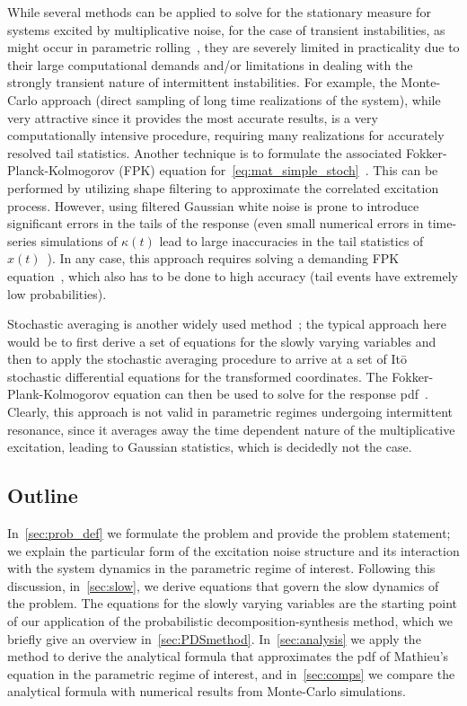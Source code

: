 \documentclass[3p]{elsarticle}
\begin{document}
While several   methods can be applied to solve for the stationary measure for systems excited by multiplicative noise, for the case  of transient instabilities,   as might occur  in parametric rolling~, they are severely limited in practicality  due to their large computational demands and/or limitations in dealing with  the strongly transient nature of intermittent instabilities.  For example, the Monte-Carlo approach (direct sampling of long time realizations  of the system), while very attractive since it  provides the most accurate results, is  a very computationally intensive procedure, requiring many realizations  for  accurately resolved  tail statistics. Another technique is to  formulate the associated Fokker-Planck-Kolmogorov (FPK) equation for~\cref{eq:mat_simple_stoch}~\cite{soize94}. This can be performed by utilizing shape filtering to  approximate the correlated excitation process.  However, using filtered Gaussian white noise is  prone to introduce significant errors in  the tails of the response (even small numerical errors in time-series simulations of $\kappa(t)$  lead to large inaccuracies in the tail statistics of $x(t)$~\cite{majda_branicki_DCDS}). In any case, this approach   requires solving a   demanding FPK equation~\cite{Masud_bergman05}, which also has to be done to high accuracy (tail events have extremely low probabilities). 

Stochastic averaging is another widely used method~\cite{Pavliotis2008}; the typical approach here   would be to first derive a set of equations for the slowly varying variables and then to  apply  the    stochastic averaging procedure to arrive at a set of  It\={o} stochastic differential equations for the transformed coordinates. The Fokker-Plank-Kolmogorov equation can then be used to solve for the response pdf~\cite{Lin_Cai95,8702927420120101}. Clearly, this approach is not valid in parametric regimes undergoing intermittent resonance, since it averages away the time dependent nature of the multiplicative excitation, leading to Gaussian statistics, which is  decidedly not the case.

\subsection{Outline}
In~\cref{sec:prob_def} we formulate the problem and provide the   problem statement; we explain  the particular form of the excitation noise structure and its interaction with the system dynamics in the parametric regime of interest. Following this discussion, in~\cref{sec:slow}, we derive equations that govern the slow dynamics of the problem. The equations for the slowly varying variables are the starting point of our application of the probabilistic decomposition-synthesis method, which we briefly give an overview in~\cref{sec:PDSmethod}. In~\cref{sec:analysis} we apply the method to derive  the  analytical formula that approximates   the pdf of Mathieu's equation in the parametric regime of interest, and in~\cref{sec:comps} we compare the analytical formula  with numerical results from Monte-Carlo simulations. 
\end{document}
